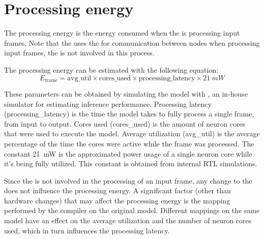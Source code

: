 \section{Processing energy}
The processing energy is the energy consumed when the \graicore{} is processing input frames.
Note that the \graicore{} uses the \eventnoc{} for communication between nodes when processing input frames, the \confignoc{} is not involved in this process.

The processing energy can be estimated with the following equation:
\begin{equation}
    E_{\textrm{frame}} = \textrm{avg\_util} \times \textrm{cores\_used} \times \textrm{processing\_latency} \times \SI{21}{mW}
\end{equation}

These parameters can be obtained by simulating the model with \textit{\graipefruit{}}, an in-house simulator for estimating inference performance.
Processing latency (\textrm{processing\_latency}) is the time the model takes to fully process a single frame, from input to output.
Cores used (\textrm{cores\_used}) is the amount of neuron cores that were used to execute the model.
Average utilization (\textrm{avg\_util}) is the average percentage of the time the cores were active while the frame was processed. 
The constant \SI{21}{mW} is the approximated power usage of a single neuron core while it's being fully utilized.
This constant is obtained from internal RTL simulations.

Since the \confignoc{} is not involved in the processing of an input frame, any change to the \confignoc{} does not influence the processing energy.
A significant factor (other than hardware changes) that may affect the processing energy is the mapping performed by the compiler on the original model. 
Different mappings on the same model have an effect on the average utilization and the number of neuron cores used, which in turn influences the processing latency.

